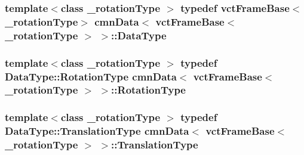 \subsubsection[{Data\+Type}]{\setlength{\rightskip}{0pt plus 5cm}template$<$class \+\_\+rotation\+Type $>$ typedef {\bf vct\+Frame\+Base}$<$\+\_\+rotation\+Type$>$ {\bf cmn\+Data}$<$ {\bf vct\+Frame\+Base}$<$ \+\_\+rotation\+Type $>$ $>$\+::{\bf Data\+Type}}\label{classcmn_data_3_01vct_frame_base_3_01__rotation_type_01_4_01_4_a6d3becc05b41db88283c842177d23bea}
\hypertarget{classcmn_data_3_01vct_frame_base_3_01__rotation_type_01_4_01_4_a8757351740a52df6d2b5be5e04ba0b0b}{}
\subsubsection[{Rotation\+Type}]{\setlength{\rightskip}{0pt plus 5cm}template$<$class \+\_\+rotation\+Type $>$ typedef {\bf Data\+Type\+::\+Rotation\+Type} {\bf cmn\+Data}$<$ {\bf vct\+Frame\+Base}$<$ \+\_\+rotation\+Type $>$ $>$\+::{\bf Rotation\+Type}}\label{classcmn_data_3_01vct_frame_base_3_01__rotation_type_01_4_01_4_a8757351740a52df6d2b5be5e04ba0b0b}
\hypertarget{classcmn_data_3_01vct_frame_base_3_01__rotation_type_01_4_01_4_a1fc56c85e3cdf6618625668e4c95950f}{}
\subsubsection[{Translation\+Type}]{\setlength{\rightskip}{0pt plus 5cm}template$<$class \+\_\+rotation\+Type $>$ typedef {\bf Data\+Type\+::\+Translation\+Type} {\bf cmn\+Data}$<$ {\bf vct\+Frame\+Base}$<$ \+\_\+rotation\+Type $>$ $>$\+::{\bf Translation\+Type}}\label{classcmn_data_3_01vct_frame_base_3_01__rotation_type_01_4_01_4_a1fc56c85e3cdf6618625668e4c95950f}


